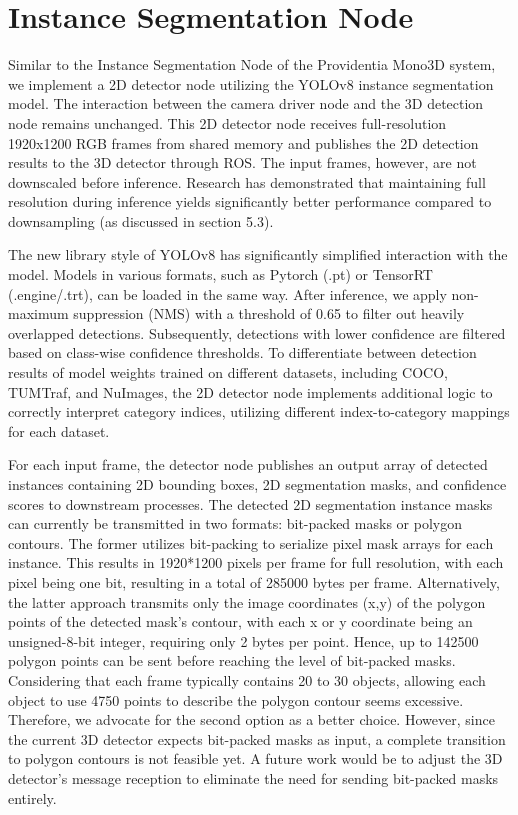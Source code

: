 \section{Instance Segmentation Node} \label{sec:object_detection_with_yolov8}

Similar to the Instance Segmentation Node of the Providentia Mono3D system, we implement a 2D detector node utilizing the YOLOv8 instance segmentation model. The interaction between the camera driver node and the 3D detection node remains unchanged. This 2D detector node receives full-resolution 1920x1200 RGB frames from shared memory and publishes the 2D detection results to the 3D detector through ROS. The input frames, however, are not downscaled before inference. Research has demonstrated that maintaining full resolution during inference yields significantly better performance compared to downsampling (as discussed in section 5.3).

The new library style of YOLOv8 has significantly simplified interaction with the model. Models in various formats, such as Pytorch (.pt) or TensorRT (.engine/.trt), can be loaded in the same way. After inference, we apply non-maximum suppression (NMS) with a threshold of 0.65 to filter out heavily overlapped detections. Subsequently, detections with lower confidence are filtered based on class-wise confidence thresholds. To differentiate between detection results of model weights trained on different datasets, including COCO, TUMTraf, and NuImages, the 2D detector node implements additional logic to correctly interpret category indices, utilizing different index-to-category mappings for each dataset.

For each input frame, the detector node publishes an output array of detected instances containing 2D bounding boxes, 2D segmentation masks, and confidence scores to downstream processes. The detected 2D segmentation instance masks can currently be transmitted in two formats: bit-packed masks or polygon contours. The former utilizes bit-packing to serialize pixel mask arrays for each instance. This results in 1920*1200 pixels per frame for full resolution, with each pixel being one bit, resulting in a total of 285000 bytes per frame. Alternatively, the latter approach transmits only the image coordinates (x,y) of the polygon points of the detected mask's contour, with each x or y coordinate being an unsigned-8-bit integer, requiring only 2 bytes per point. Hence, up to 142500 polygon points can be sent before reaching the level of bit-packed masks. Considering that each frame typically contains 20 to 30 objects, allowing each object to use 4750 points to describe the polygon contour seems excessive. Therefore, we advocate for the second option as a better choice. However, since the current 3D detector expects bit-packed masks as input, a complete transition to polygon contours is not feasible yet. A future work would be to adjust the 3D detector's message reception to eliminate the need for sending bit-packed masks entirely.


